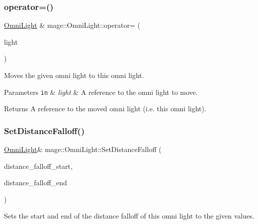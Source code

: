 \subsubsection{\texorpdfstring{operator=()}{operator=()}\hspace{0.1cm}{\footnotesize\ttfamily [2/2]}}
{\footnotesize\ttfamily \hyperlink{classmage_1_1_omni_light}{Omni\+Light} \& mage\+::\+Omni\+Light\+::operator= (\begin{DoxyParamCaption}\item[{\hyperlink{classmage_1_1_omni_light}{Omni\+Light} \&\&}]{light }\end{DoxyParamCaption})\hspace{0.3cm}{\ttfamily [default]}}

Moves the given omni light to this omni light.


\begin{DoxyParams}[1]{Parameters}
\mbox{\tt in}  & {\em light} & A reference to the omni light to move. \\
\hline
\end{DoxyParams}
\begin{DoxyReturn}{Returns}
A reference to the moved omni light (i.\+e. this omni light). 
\end{DoxyReturn}
\hypertarget{classmage_1_1_omni_light_a148c13f7b6191c88f069730777d31eb3}{}\label{classmage_1_1_omni_light_a148c13f7b6191c88f069730777d31eb3} 
\subsubsection{\texorpdfstring{Set\+Distance\+Falloff()}{SetDistanceFalloff()}}
{\footnotesize\ttfamily \hyperlink{classmage_1_1_omni_light}{Omni\+Light}\& mage\+::\+Omni\+Light\+::\+Set\+Distance\+Falloff (\begin{DoxyParamCaption}\item[{float}]{distance\+\_\+falloff\+\_\+start,  }\item[{float}]{distance\+\_\+falloff\+\_\+end }\end{DoxyParamCaption})}

Sets the start and end of the distance falloff of this omni light to the given values.


